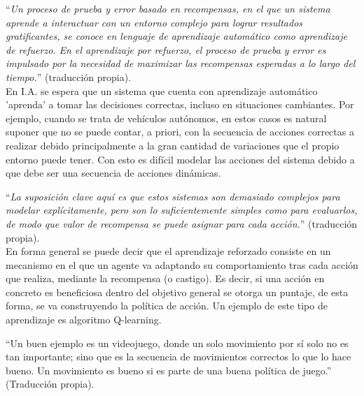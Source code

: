         ``\textit{Un proceso de prueba y error basado en recompensas, en el que un sistema aprende a interactuar con un entorno complejo para lograr resultados gratificantes, se conoce en lenguaje de aprendizaje automático como aprendizaje de refuerzo. En el aprendizaje por refuerzo, el proceso de prueba y error es impulsado por la necesidad de maximizar las recompensas esperadas a lo largo del tiempo.}'' \cite[Pág 374]{Aggarwal2018} (traducción propia).\\

        En I.A. se espera que un sistema que cuenta con aprendizaje automático 'aprenda' a tomar las decisiones correctas, incluso en situaciones cambiantes. Por ejemplo, cuando se trata de vehículos autónomos, en estos casos es natural suponer que no se puede contar, a priori, con la secuencia de acciones correctas a realizar debido principalmente a la gran cantidad de variaciones que el propio entorno puede tener. Con esto es difícil modelar las acciones del sistema debido a que debe ser una secuencia de acciones dinámicas. 
        
        ``\textit{La suposición clave aquí es que estos sistemas son demasiado complejos para modelar explícitamente, pero son lo suficientemente simples como para evaluarlos, de modo que valor de recompensa se puede asignar para cada acción.}'' \cite[Pág 44]{Aggarwal2018} (traducción propia).\\
        
        En forma general se puede decir que el aprendizaje reforzado consiste en un mecanismo en el que un agente va adaptando su comportamiento tras cada acción que realiza, mediante la recompensa (o castigo). Es decir, si una acción en concreto es beneficiosa dentro del objetivo general se otorga un puntaje, de esta forma, se va construyendo la política de acción. Un ejemplo de este tipo de aprendizaje es algoritmo Q-learning.
        
        ``Un buen ejemplo es un videojuego, donde un solo movimiento por sí solo no es tan importante; sino que es la secuencia de movimientos correctos lo que lo hace bueno. Un movimiento es bueno si es parte de una buena política de juego.''  \cite[Pag. 13]{alpaydin2014ML} (Traducción propia).\\
        
